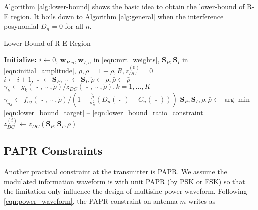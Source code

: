 Algorithm \ref{alg:lower-bound} shows the basic idea to obtain the lower-bound of R-E region. It boils down to Algorithm \ref{alg:general} when the interference posynomial ${D_n} = 0$ for all $n$.

\begin{algorithm}
  \caption{Lower-Bound of R-E Region}
  \label{alg:lower-bound}
  \begin{algorithmic}[1]
    \State \textbf{Initialize:} $i \leftarrow 0$, ${{\mathbf{w}}_{P,n}},{{\mathbf{w}}_{I,n}}$ in \eqref{eqn:mrt_weights}, ${{{\mathbf{S}}_P},{{\mathbf{S}}_I}}$ in \eqref{eqn:initial_amplitude}, $\rho ,\bar \rho  = 1 - \rho ,\bar R,z_{DC}^{(0)} = 0$
    \Repeat
      \State $i \leftarrow i + 1,\mathop {{{\mathbf{S}}_P}}\limits^{..}  \leftarrow {{\mathbf{S}}_P},\mathop {{{\mathbf{S}}_I}}\limits^{..}  \leftarrow {{\mathbf{S}}_I},\ddot \rho  \leftarrow \rho ,\ddot{\bar{\rho}}  \leftarrow \bar \rho $
      \State ${\gamma _k} \leftarrow {g_k}\left( {\mathop {{{\mathbf{S}}_P}}\limits^{..} ,\mathop {{{\mathbf{S}}_I}}\limits^{..} ,\ddot \rho } \right)/{z_{DC}}\left( {\mathop {{{\mathbf{S}}_P}}\limits^{..} ,\mathop {{{\mathbf{S}}_I}}\limits^{..} ,\ddot \rho } \right),k = 1, \ldots ,K$
      \State ${\gamma _{nj}} \leftarrow {f_{nj}}\left( {\mathop {{{\mathbf{S}}_P}}\limits^{..} ,\mathop {{{\mathbf{S}}_I}}\limits^{..} ,\ddot \rho } \right)/\left( {1 + \frac{{\ddot{\bar{\rho}}}}{{\sigma _n^2}}\left( {{D_n}\left( {\mathop {{{\mathbf{S}}_P}}\limits^{..} } \right) + {C_n}\left( {\mathop {{{\mathbf{S}}_I}}\limits^{..} } \right)} \right)} \right)$
      \State ${{\mathbf{S}}_P},{{\mathbf{S}}_I},\rho ,\bar \rho  \leftarrow \arg \min $ \eqref{eqn:lower_bound_target} -- \eqref{eqn:lower_bound_ratio_constraint}
      \State $z_{DC}^{(i)} \leftarrow {z_{DC}}\left( {{{\mathbf{S}}_P},{{\mathbf{S}}_I},\rho } \right)$
  \end{algorithmic}
\end{algorithm}



\subsection{PAPR Constraints}\label{sec:papr-constraints}
Another practical constraint at the transmitter is PAPR. We assume the modulated information waveform is with unit PAPR (by PSK or FSK) so that the limitation only influence the design of multisine power waveform. Following \eqref{eqn:power_waveform}, the PAPR constraint on antenna $m$ writes as

